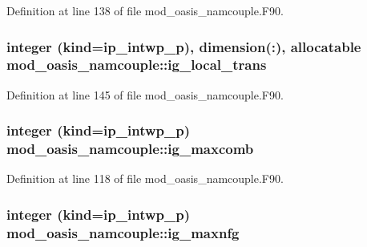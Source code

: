 Definition at line 138 of file mod\+\_\+oasis\+\_\+namcouple.\+F90.

\hypertarget{classmod__oasis__namcouple_a510a13e57f2f65d5ddc70c729d54c0f6}{
\subsubsection[{ig\+\_\+local\+\_\+trans}]{\setlength{\rightskip}{0pt plus 5cm}integer (kind=ip\+\_\+intwp\+\_\+p), dimension(\+:), allocatable mod\+\_\+oasis\+\_\+namcouple\+::ig\+\_\+local\+\_\+trans\hspace{0.3cm}{\ttfamily [private]}}}\label{classmod__oasis__namcouple_a510a13e57f2f65d5ddc70c729d54c0f6}


Definition at line 145 of file mod\+\_\+oasis\+\_\+namcouple.\+F90.

\hypertarget{classmod__oasis__namcouple_abba00866a740567bc1d93cf5850042fd}{
\subsubsection[{ig\+\_\+maxcomb}]{\setlength{\rightskip}{0pt plus 5cm}integer (kind=ip\+\_\+intwp\+\_\+p) mod\+\_\+oasis\+\_\+namcouple\+::ig\+\_\+maxcomb\hspace{0.3cm}{\ttfamily [private]}}}\label{classmod__oasis__namcouple_abba00866a740567bc1d93cf5850042fd}


Definition at line 118 of file mod\+\_\+oasis\+\_\+namcouple.\+F90.

\hypertarget{classmod__oasis__namcouple_aab2d4bcc2dc767df51f99f907f4f3e6e}{
\subsubsection[{ig\+\_\+maxnfg}]{\setlength{\rightskip}{0pt plus 5cm}integer (kind=ip\+\_\+intwp\+\_\+p) mod\+\_\+oasis\+\_\+namcouple\+::ig\+\_\+maxnfg\hspace{0.3cm}{\ttfamily [private]}}}\label{classmod__oasis__namcouple_aab2d4bcc2dc767df51f99f907f4f3e6e}


